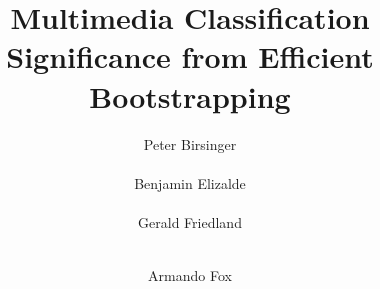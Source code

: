 \documentclass{acm_proc_article-sp}
\title{ Multimedia Classification Significance from Efficient Bootstrapping}
\author{
\alignauthor 
Peter Birsinger\\
       \affaddr{UC Berkeley}\\
       \email{peterbir@eecs.berkeley.edu}
\alignauthor 
Benjamin Elizalde\\
       \affaddr{UC Berkeley}\\
       \email{benmael@icsi}%
\alignauthor 
Gerald Friedland\\
       \affaddr{UC Berkeley}\\
       \email{fractor@icsi}%
\and
\alignauthor 
Armando Fox\\
       \affaddr{UC Berkeley}\\
       \email{fox@cs.berkeley.edu}
}
\begin{document}
\maketitle
























\balancecolumns
\end{document}
